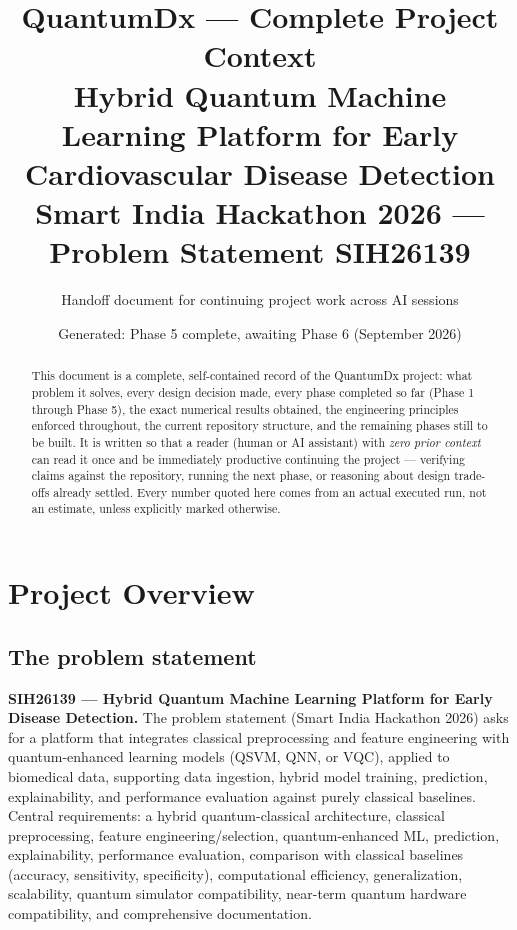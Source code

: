 \documentclass[11pt,a4paper]{article}
\title{\textbf{QuantumDx --- Complete Project Context}\\[0.3em]
\large Hybrid Quantum Machine Learning Platform for Early Cardiovascular Disease Detection\\[0.2em]
\normalsize Smart India Hackathon 2026 --- Problem Statement SIH26139}
\author{Handoff document for continuing project work across AI sessions}
\date{Generated: Phase 5 complete, awaiting Phase 6 (September 2026)}
\begin{document}
\maketitle
\thispagestyle{empty}

\begin{abstract}
\noindent This document is a complete, self-contained record of the QuantumDx project: what problem it solves, every design decision made, every phase completed so far (Phase 1 through Phase 5), the exact numerical results obtained, the engineering principles enforced throughout, the current repository structure, and the remaining phases still to be built. It is written so that a reader (human or AI assistant) with \emph{zero prior context} can read it once and be immediately productive continuing the project --- verifying claims against the repository, running the next phase, or reasoning about design trade-offs already settled. Every number quoted here comes from an actual executed run, not an estimate, unless explicitly marked otherwise.
\end{abstract}

\tableofcontents
\newpage

\section{Project Overview}

\subsection{The problem statement}

\textbf{SIH26139 --- Hybrid Quantum Machine Learning Platform for Early Disease Detection.} The problem statement (Smart India Hackathon 2026) asks for a platform that integrates classical preprocessing and feature engineering with quantum-enhanced learning models (QSVM, QNN, or VQC), applied to biomedical data, supporting data ingestion, hybrid model training, prediction, explainability, and performance evaluation against purely classical baselines. Central requirements: a hybrid quantum-classical architecture, classical preprocessing, feature engineering/selection, quantum-enhanced ML, prediction, explainability, performance evaluation, comparison with classical baselines (accuracy, sensitivity, specificity), computational efficiency, generalization, scalability, quantum simulator compatibility, near-term quantum hardware compatibility, and comprehensive documentation.
\end{document}
